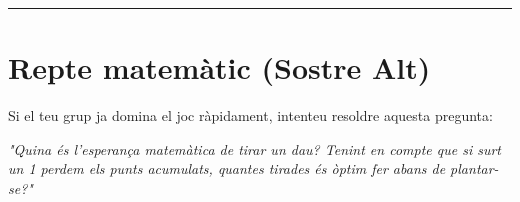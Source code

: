 \documentclass[12pt,a4paper]{article}
\begin{document}
\vspace{0.5cm}
\hrule
\vspace{0.5cm}

\section*{Repte matemàtic (Sostre Alt)}

Si el teu grup ja domina el joc ràpidament, intenteu resoldre aquesta pregunta:

\textit{"Quina és l'esperança matemàtica de tirar un dau? Tenint en compte que si surt un 1 perdem els punts acumulats, quantes tirades és òptim fer abans de plantar-se?"}
\end{document}
